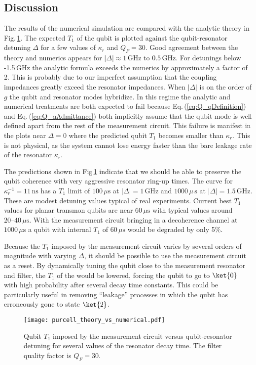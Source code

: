 \subsection{Discussion}

The results of the numerical simulation are compared with the analytic theory in Fig.\,\ref{Fig:purcellTheoryVsNumerical}.
The expected $T_1$ of the qubit is plotted against the qubit-resonator detuning $\Delta$ for a few values of $\kappa_r$ and $Q_F=30$.
Good agreement between the theory and numerics appears for $\left| \Delta \right| \approx 1\,\text{GHz} \text{ to } 0.5\,\text{GHz}$.
For detunings below -1.5\,GHz the analytic formula exceeds the numerics by approximately a factor of 2.
This is probably due to our imperfect assumption that the coupling impedances greatly exceed the resonator impedances.
When $\left| \Delta \right|$ is on the order of $g$ the qubit and resonator modes hybridize.
In this regime the analytic and numerical treatments are both expected to fail because Eq.\,(\ref{eq:Q_qDefinition}) and Eq.\,(\ref{eq:Q_qAdmittance}) both implicitly assume that the qubit mode is well defined apart from the rest of the measurement circuit.
This failure is manifest in the plots near $\Delta=0$ where the predicted qubit $T_1$ becomes smaller than $\kappa_r$.
This is not physical, as the system cannot lose energy faster than the bare leakage rate of the resonator $\kappa_r$.

The predictions shown in Fig\,\ref{Fig:purcellTheoryVsNumerical} indicate that we should be able to preserve the qubit coherence with very aggressive resonator ring-up times.
The curve for $\kappa_r^{-1} = 11\,\text{ns}$ has a $T_1$ limit of $100\,\mu\text{s}$ at $\left| \Delta \right| = 1\,\text{GHz}$ and $1000\,\mu\,\text{s}$ at $\left| \Delta \right| = 1.5\,\text{GHz}$.
These are modest detuning values typical of real experiments. Current best $T_1$ values for planar transmon qubits are near $60\,\mu\text{s}$ with typical values around $20\text{--}40\,\mu\text{s}$.
With the measurement circuit bringing in a decoherence channel at $1000\,\mu\text{s}$ a qubit with internal $T_1$ of $60\,\mu\text{s}$ would be degraded by only 5\%.

Because the $T_1$ imposed by the measurement circuit varies by several orders of magnitude with varying $\Delta$, it should be possible to use the measurement circuit as a reset.
By dynamically tuning the qubit close to the measurement resonator and filter, the $T_1$ of the would be lowered, forcing the qubit to go to $\ket{0}$ with high probability after several decay time constants.
This could be particularly useful in removing ``leakage'' processes in which the qubit has erroneously gone to state $\ket{2}$.

\begin{figure}
\begin{centering}
\texttt{[image: purcell\_theory\_vs\_numerical.pdf]}
\par\end{centering}
\caption{Qubit $T_1$ imposed by the measurement circuit versus qubit-resonator detuning for several values of the resonator decay time. The filter quality factor is $Q_F=30$.}
\label{Fig:purcellTheoryVsNumerical}
\end{figure}

